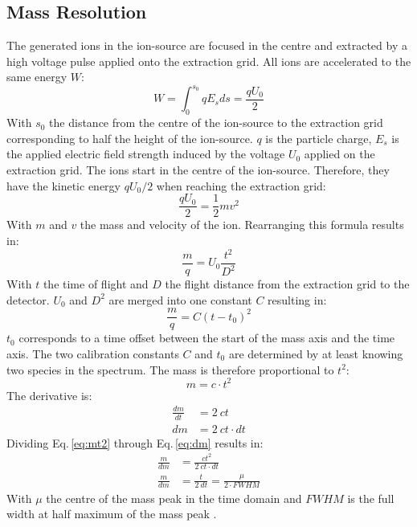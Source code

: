 	
	\subsection{Mass Resolution }\label{chap:massRes}
	The generated ions in the ion-source are focused in the centre and extracted by a high voltage pulse applied onto the extraction grid. All ions are accelerated to the same energy $W$:
	\begin{equation}
		W = \int_{0}^{s_0}q E_s ds =  \frac{q U_0}{2}
		\label{eq:WIonPulse}
	\end{equation}
	With $s_0$ the distance from the centre of the ion-source to the extraction grid corresponding to half the height of the ion-source. $q$ is the particle charge, $E_s$ is the applied electric field strength induced by the voltage $U_0$ applied on the extraction grid. The ions start in the centre of the ion-source. Therefore, they have the kinetic energy $q U_0/2$ when reaching the extraction grid:
	\begin{equation}
		\frac{q U_0}{2} = \frac{1}{2}m v^2
	\end{equation}
	With $m$ and $v$ the mass and velocity of the ion. Rearranging this formula results in:
	\begin{equation}
		\frac{m}{q} = U_0\frac{t^2}{D^2}
		\label{eq:m/q}
	\end{equation}
	With $t$ the time of flight and $D$ the flight distance from the extraction grid to the detector. $U_0$ and $D^2$ are merged into one constant $C$ resulting in:
	\begin{equation}
		\frac{m}{q} = C(t-t_0)^2
		\label{eq:mass_Calib}
	\end{equation}
	$t_0$ corresponds to a time offset between the start of the mass axis and the time axis. The two calibration constants $C$ and $t_0$ are determined by at least knowing two species in the spectrum. The mass is therefore proportional to $t^2$:
	\begin{equation}
		m = c\cdot t^2
		\label{eq:mt2}
	\end{equation}
	The derivative is:
	\begin{align}
		\frac{dm}{dt} &= 2~ct\\
		dm &= 2~ct\cdot dt
		\label{eq:dm}
	\end{align}
	Dividing Eq.\,\eqref{eq:mt2} through Eq.\,\eqref{eq:dm} results in:
	\begin{align}
		\frac{m}{dm} &= \frac{ct^2}{2~ct\cdot dt}\\
		\frac{m}{dm} &= \frac{t}{2~dt} = \frac{\mu}{2\cdot FWHM}
		\label{eq:massRes}
	\end{align}
	With $\mu$ the centre of the mass peak in the time domain and $FWHM$ is the full width at half maximum of the mass peak \cite{LecNot_Wurz2017}.\\
	
